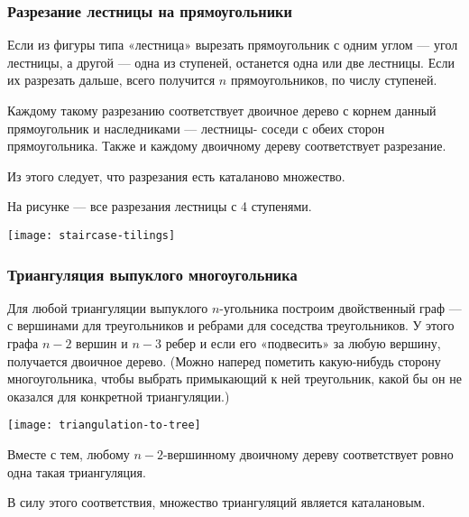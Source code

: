 \documentclass[mathserif]{beamer}
\begin{document}
\begin{frame}[fragile]%
\frametitle{Разрезание лестницы на прямоугольники}
Если из фигуры типа «лестница» вырезать прямоугольник с одним углом — угол лестницы, а другой — одна из ступеней, останется одна или две лестницы.
Если их разрезать дальше, всего получится $n$ прямоугольников, по числу ступеней.

\medskip

Каждому такому разрезанию соответствует двоичное дерево с корнем данный прямоугольник и наследниками — лестницы-
соседи с обеих сторон прямоугольника.
Также и каждому двоичному дереву соответствует разрезание.

\medskip

Из этого следует, что разрезания есть каталаново множество.

\medskip

На рисунке — все разрезания лестницы с 4 ступенями.

\bigskip

\centerline{\texttt{[image: staircase-tilings]}}
\end{frame}

\begin{frame}[fragile]%
\frametitle{Триангуляция выпуклого многоугольника}
\begin{minipage}{.60\textwidth}
\small
Для любой триангуляции выпуклого $n$-угольника построим двойственный граф — с вершинами для треугольников и ребрами для соседства треугольников.
У этого графа $n{-}2$ вершин и $n{-}3$ ребер и если его «подвесить» за любую вершину, получается двоичное дерево.
(Можно наперед пометить какую-нибудь сторону многоугольника, чтобы выбрать примыкающий к ней треугольник, какой бы он не оказался для конкретной триангуляции.)
\end{minipage}\hfill%
\begin{minipage}{.35\textwidth}
\centerline{\texttt{[image: triangulation-to-tree]}}
\end{minipage}

\medskip

Вместе с тем, любому $n{-}2$-вершинному двоичному дереву соответствует ровно одна такая триангуляция.

\medskip

В силу этого соответствия, множество триангуляций является каталановым.
\end{frame}
\end{document}
